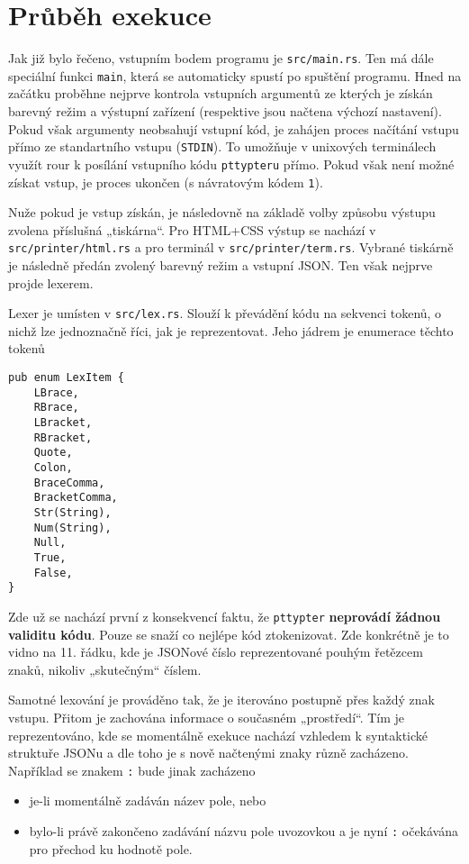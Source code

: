 \documentclass[11pt, letterpaper]{article}
\begin{document}
\section{Průběh exekuce}
Jak již bylo řečeno, vstupním bodem programu je \texttt{src/main.rs}. Ten má dále speciální funkci \texttt{main}, která se automaticky spustí po spuštění programu. Hned na začátku proběhne nejprve kontrola vstupních argumentů ze kterých je získán barevný režim a výstupní zařízení (respektive jsou načtena výchozí nastavení). Pokud však argumenty neobsahují vstupní kód, je zahájen proces načítání vstupu přímo ze standartního vstupu (\texttt{STDIN}). To umožňuje v unixových terminálech využít rour k posílání vstupního kódu \texttt{pttypteru} přímo. Pokud však není možné získat vstup, je proces ukončen (s návratovým kódem \texttt{1}).

Nuže pokud je vstup získán, je následovně na základě volby způsobu výstupu zvolena příslušná „tiskárna“. Pro HTML+CSS výstup se nachází v \texttt{src/printer/html.rs} a pro terminál v \texttt{src/printer/term.rs}. Vybrané tiskárně je následně předán zvolený barevný režim a vstupní JSON. Ten však nejprve projde lexerem.

Lexer je umísten v \texttt{src/lex.rs}. Slouží k převádění kódu na sekvenci tokenů, o nichž lze jednoznačně říci, jak je reprezentovat. Jeho jádrem je enumerace těchto tokenů
\begin{lstlisting}
pub enum LexItem {
    LBrace,
    RBrace,
    LBracket,
    RBracket,
    Quote,
    Colon,
    BraceComma,
    BracketComma,
    Str(String),
    Num(String),
    Null,
    True,
    False,
}
\end{lstlisting}

Zde už se nachází první z konsekvencí faktu, že \texttt{pttypter} \textbf{neprovádí žádnou validitu kódu}. Pouze se snaží co nejlépe kód ztokenizovat. Zde konkrétně je to vidno na 11. řádku, kde je JSONové číslo reprezentované pouhým řetězcem znaků, nikoliv „skutečným“ číslem.

Samotné lexování je prováděno tak, že je iterováno postupně přes každý znak vstupu. Přitom je zachována informace o současném „prostředí“. Tím je reprezentováno, kde se momentálně exekuce nachází vzhledem k syntaktické struktuře JSONu a dle toho je s nově načtenými znaky různě zacházeno. Například se znakem \texttt{:} bude jinak zacházeno
\begin{itemize}
    \item je-li momentálně zadáván název pole, nebo
    \item bylo-li právě zakončeno zadávání názvu pole uvozovkou a je nyní \texttt{:} očekávána pro přechod ku hodnotě pole.
\end{itemize}
\end{document}
